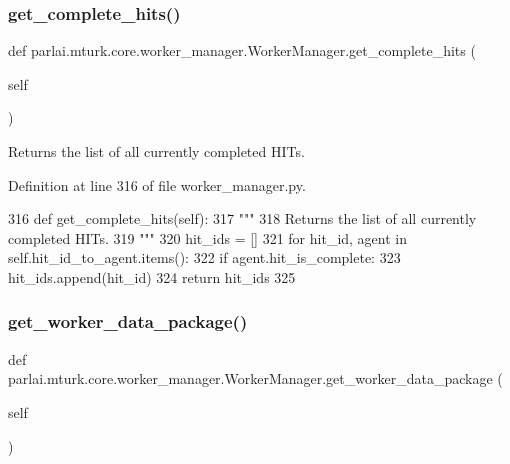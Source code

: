 \subsubsection{\texorpdfstring{get\+\_\+complete\+\_\+hits()}{get\_complete\_hits()}}
{\footnotesize\ttfamily def parlai.\+mturk.\+core.\+worker\+\_\+manager.\+Worker\+Manager.\+get\+\_\+complete\+\_\+hits (\begin{DoxyParamCaption}\item[{}]{self }\end{DoxyParamCaption})}

\begin{DoxyVerb}Returns the list of all currently completed HITs.
\end{DoxyVerb}
 

Definition at line 316 of file worker\+\_\+manager.\+py.


\begin{DoxyCode}
316     \textcolor{keyword}{def }get\_complete\_hits(self):
317         \textcolor{stringliteral}{"""}
318 \textcolor{stringliteral}{        Returns the list of all currently completed HITs.}
319 \textcolor{stringliteral}{        """}
320         hit\_ids = []
321         \textcolor{keywordflow}{for} hit\_id, agent \textcolor{keywordflow}{in} self.hit\_id\_to\_agent.items():
322             \textcolor{keywordflow}{if} agent.hit\_is\_complete:
323                 hit\_ids.append(hit\_id)
324         \textcolor{keywordflow}{return} hit\_ids
325 
\end{DoxyCode}
\mbox{\label{classparlai_1_1mturk_1_1core_1_1worker__manager_1_1WorkerManager_ae583d18246beaa4e75c2d1d539fe77ad}} 
\subsubsection{\texorpdfstring{get\+\_\+worker\+\_\+data\+\_\+package()}{get\_worker\_data\_package()}}
{\footnotesize\ttfamily def parlai.\+mturk.\+core.\+worker\+\_\+manager.\+Worker\+Manager.\+get\+\_\+worker\+\_\+data\+\_\+package (\begin{DoxyParamCaption}\item[{}]{self }\end{DoxyParamCaption})}



